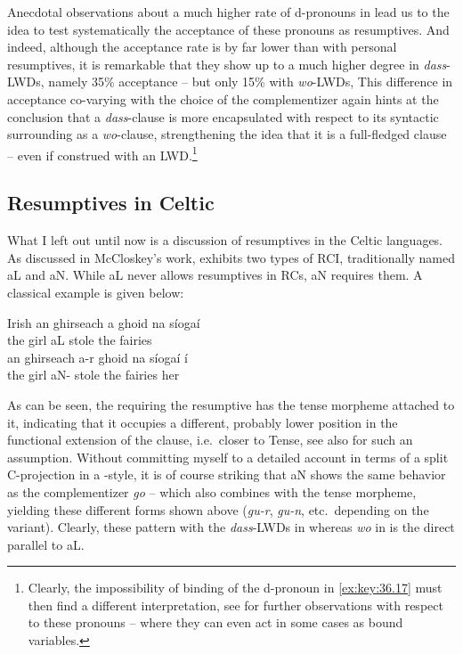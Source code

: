 \documentclass[output=paper]{langsci/langscibook}
\begin{document}
Anecdotal observations about a much higher rate of d-pronouns in  lead
us to the idea to test systematically the acceptance of these pronouns as
resumptives. And indeed, although the acceptance rate is by far lower than with
personal resumptives, it is remarkable that they show up to a much higher
degree in \emph{dass}-\glspl{LWD}, namely 35\% acceptance -- but only 15\%
with \emph{wo}-\gls{LWD}s,  This difference in acceptance co-varying with the
choice of the complementizer again hints at the conclusion that a
\emph{dass}-clause is more encapsulated with respect to its syntactic
surrounding as a \emph{wo}-clause, strengthening the idea that it is a
full-fledged clause -- even if construed with an \gls{LWD}.\footnote{Clearly,
    the impossibility of binding of the d-pronoun in \eqref{ex:key:36.17} must
then find a different interpretation, see \citet{vanKampen2012} for further
observations with respect to these pronouns – where they can even act in some
cases as bound variables.}

\subsection{Resumptives in Celtic}\label{sub:36.3.5} %

What I left out until now is a discussion of resumptives in the Celtic
languages. As discussed in McCloskey’s work,  exhibits two types of RCI,
traditionally named aL and aN. While aL never allows resumptives in \glspl{RC},
aN requires them. A classical example is given below:\largerpage[2]

\ea\label{ex:key:36.18}Irish
    \ea
    \gll    an ghirseach a ghoid na síogaí\\
             the girl aL stole the fairies \underline{\hphantom{2em}}\\
    \ex
    \gll    an ghirseach a-r            ghoid na síogaí í\\
            the girl aN-\Pst{} stole the fairies her\\
    \z
\z

As can be seen, the \Rci{} requiring the resumptive has the tense morpheme
attached to it, indicating that it occupies a different, probably lower
position in the functional extension of the clause, i.e.\ closer to Tense, see
also \citet{Roberts2005} for such an assumption. Without committing myself to a
detailed account in terms of a split C-projection in a \citet{Rizzi1997}-style,
it is of course striking that aN shows the same behavior as the complementizer
\emph{go} – which also combines with the tense morpheme, yielding these
different forms shown above (\emph{gu-r}, \emph{gu-n}, etc.\ depending on the
variant). Clearly, these pattern with the \emph{dass}-\glspl{LWD} in  whereas
\emph{wo} in  is the direct parallel to aL.
\end{document}
